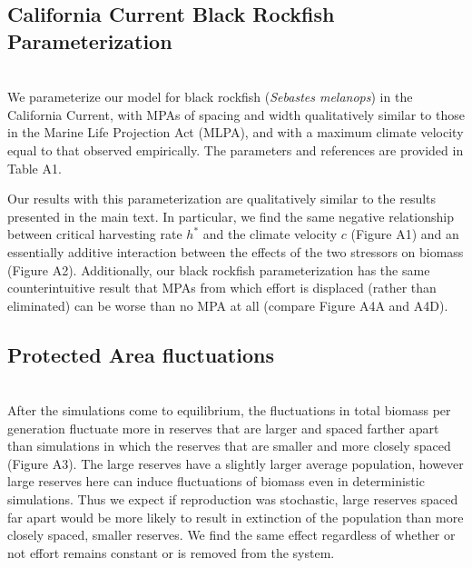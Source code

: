 \documentclass[12pt,english]{article}
\begin{document}
\subsection{California Current Black Rockfish Parameterization \label{rock}}
~\\We parameterize our model for black rockfish (\emph{Sebastes melanops}) in the California Current, with MPAs of spacing and width qualitatively similar to those in the Marine Life Projection Act (MLPA), and with a maximum climate velocity equal to that observed empirically. The parameters and references are provided in Table A1.

Our results with this parameterization are qualitatively similar to the results presented in the main text. In particular, we find the same negative relationship between critical harvesting rate $h^*$ and the climate velocity $c$ (Figure A1) and an essentially additive interaction between the effects of the two stressors on biomass (Figure A2). Additionally, our black rockfish parameterization has the same counterintuitive result that MPAs from which effort is displaced (rather than eliminated) can be worse than no MPA at all (compare Figure A4A and A4D). 

\subsection{Protected Area fluctuations \label{MPA}}
~\\After the simulations come to equilibrium, the fluctuations in total biomass per generation fluctuate more in reserves that are larger and spaced farther apart than simulations in which the reserves that are smaller and more closely spaced (Figure A3). The large reserves have a slightly larger average population, however large reserves here can induce fluctuations of biomass even in deterministic simulations. Thus we expect if reproduction was stochastic, large reserves spaced far apart would be more likely to result in extinction of the population than more closely spaced, smaller reserves. We find the same effect regardless of whether or not effort remains constant or is removed from the system. 
\end{document}
